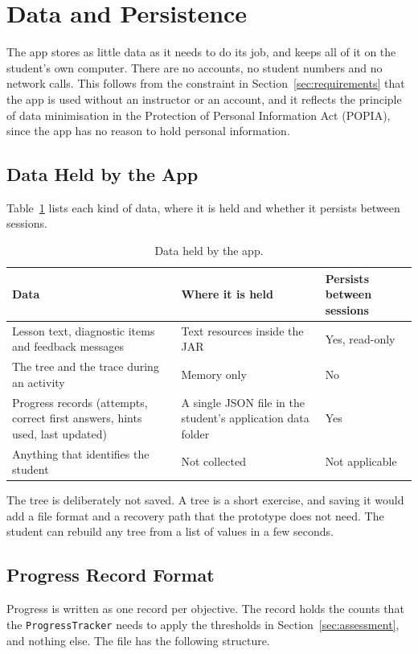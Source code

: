 \section{Data and Persistence}\label{sec:data}


The app stores as little data as it needs to do its job, and keeps all of it on the student's own computer. There are no accounts, no student numbers and no network calls. This follows from the constraint in Section~\ref{sec:requirements} that the app is used without an instructor or an account, and it reflects the principle of data minimisation in the Protection of Personal Information Act (POPIA), since the app has no reason to hold personal information.

\subsection{Data Held by the App}
Table~\ref{tab:data} lists each kind of data, where it is held and whether it persists between sessions.

\begin{table}[H]
\centering
\small
\caption{Data held by the app.}
\label{tab:data}
\begin{tabularx}{\textwidth}{p{3.8cm} p{3.6cm} X}
\toprule
Data & Where it is held & Persists between sessions \\
\midrule
Lesson text, diagnostic items and feedback messages & Text resources inside the JAR & Yes, read-only \\
The tree and the trace during an activity & Memory only & No \\
Progress records (attempts, correct first answers, hints used, last updated) & A single JSON file in the student's application data folder & Yes \\
Anything that identifies the student & Not collected & Not applicable \\
\bottomrule
\end{tabularx}
\end{table}

The tree is deliberately not saved. A tree is a short exercise, and saving it would add a file format and a recovery path that the prototype does not need. The student can rebuild any tree from a list of values in a few seconds.

\subsection{Progress Record Format}
Progress is written as one record per objective. The record holds the counts that the \texttt{ProgressTracker} needs to apply the thresholds in Section~\ref{sec:assessment}, and nothing else. The file has the following structure.


